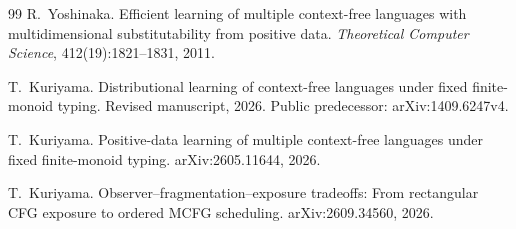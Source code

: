 \documentclass[11pt]{article}
\theoremstyle{definition}
\theoremstyle{remark}
\begin{document}
\begin{thebibliography}{99}
R.~Yoshinaka.
\newblock Efficient learning of multiple context-free languages with
multidimensional substitutability from positive data.
\newblock \emph{Theoretical Computer Science}, 412(19):1821--1831, 2011.

T.~Kuriyama.
\newblock Distributional learning of context-free languages under fixed
finite-monoid typing.
\newblock Revised manuscript, 2026. Public predecessor: arXiv:1409.6247v4.

T.~Kuriyama.
\newblock Positive-data learning of multiple context-free languages under
fixed finite-monoid typing.
\newblock arXiv:2605.11644, 2026.

T.~Kuriyama.
\newblock Observer--fragmentation--exposure tradeoffs: From rectangular CFG
exposure to ordered MCFG scheduling.
\newblock arXiv:2609.34560, 2026.

\end{thebibliography}
\end{document}
